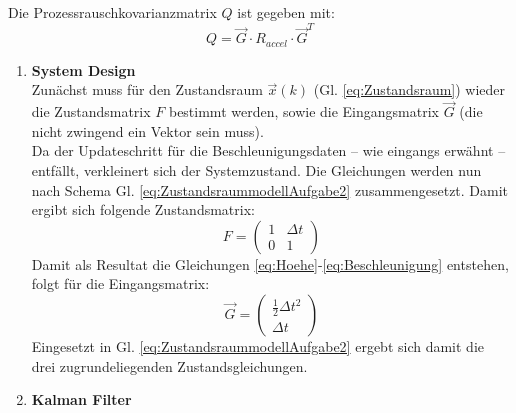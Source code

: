\documentclass[12pt,a4paper]{article}
\begin{document}
\begin{enumerate}[label=\textbf{\arabic*})]
	Die Prozessrauschkovarianzmatrix $Q$ ist gegeben mit:
	\begin{equation}
		Q = \vec{G}\cdot R_{accel} \cdot \vec{G}^{T}
	\end{equation}
	
	\begin{enumerate}[label=\textbf{\alph*})]
		
		\item \textbf{System Design}\label{subfig:Aufgabe2SystemDesign}\\
		
		Zunächst muss für den Zustandsraum $\vec{x}(k)$ (Gl. \ref{eq:Zustandsraum}) wieder die Zustandsmatrix $F$ bestimmt werden, sowie die Eingangsmatrix $\vec{G}$ (die nicht zwingend ein Vektor sein muss).\\
		
		Da der Updateschritt für die Beschleunigungsdaten -- wie eingangs erwähnt -- entfällt, verkleinert sich der Systemzustand. Die Gleichungen werden nun nach Schema Gl. \ref{eq:ZustandsraummodellAufgabe2} zusammengesetzt. Damit ergibt sich folgende Zustandsmatrix:
		\begin{equation}\label{eq:ZustandsmatrixFverkleinert}
			F =
			\begin{pmatrix}
			1 & \Delta t\\
			0 & 1
			\end{pmatrix}		
		\end{equation}
		Damit als Resultat die Gleichungen \ref{eq:Hoehe}-\ref{eq:Beschleunigung} entstehen, folgt für die Eingangsmatrix:
		\begin{equation}\label{eq:EingangsmatrixG}
			\vec{G} =
			\begin{pmatrix}
			\frac{1}{2}\Delta t^{2} \\
			\Delta t
			\end{pmatrix}		
		\end{equation}
		Eingesetzt in Gl. \ref{eq:ZustandsraummodellAufgabe2} ergebt sich damit die drei zugrundeliegenden Zustandsgleichungen.\\
		
		\item \textbf{Kalman Filter}\label{subsec:KalmanFilterAufgabe2}\\
		

\end{enumerate}
\end{enumerate}
\end{document}
